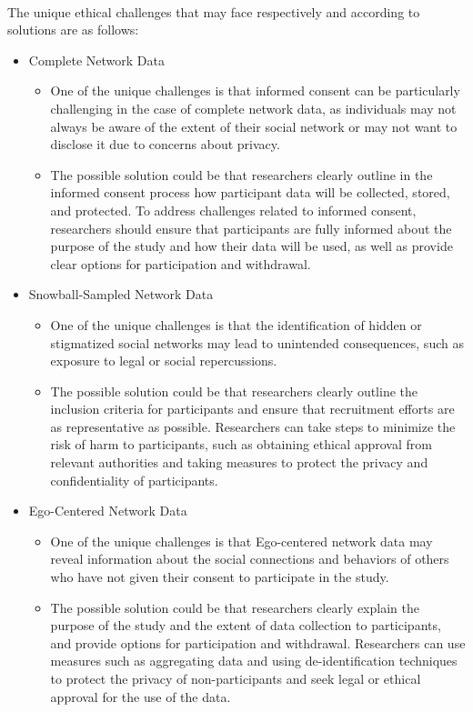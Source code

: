 \documentclass[11pt]{article}
\begin{document}
    \\ The unique ethical challenges that may face respectively and according to solutions are as follows:
    
    \begin{itemize}
        \item Complete Network Data
            \begin{itemize}
                \item One of the unique challenges is that informed consent can be particularly challenging in the case of complete network data, as individuals may not always be aware of the extent of their social network or may not want to disclose it due to concerns about privacy.
                \item The possible solution could be that researchers clearly outline in the informed consent process how participant data will be collected, stored, and protected. To address challenges related to informed consent, researchers should ensure that participants are fully informed about the purpose of the study and how their data will be used, as well as provide clear options for participation and withdrawal.
            \end{itemize}
        \item Snowball-Sampled Network Data 
            \begin{itemize}
                \item One of the unique challenges is that the identification of hidden or stigmatized social networks may lead to unintended consequences, such as exposure to legal or social repercussions.
                \item The possible solution could be that researchers clearly outline the inclusion criteria for participants and ensure that recruitment efforts are as representative as possible. Researchers can take steps to minimize the risk of harm to participants, such as obtaining ethical approval from relevant authorities and taking measures to protect the privacy and confidentiality of participants.
            \end{itemize}
        \item Ego-Centered Network Data
            \begin{itemize}
                \item One of the unique challenges is that Ego-centered network data may reveal information about the social connections and behaviors of others who have not given their consent to participate in the study.
                \item The possible solution could be that researchers clearly explain the purpose of the study and the extent of data collection to participants, and provide options for participation and withdrawal. Researchers can use measures such as aggregating data and using de-identification techniques to protect the privacy of non-participants and seek legal or ethical approval for the use of the data.
                
            \end{itemize}
    \end{itemize}
\end{document}

